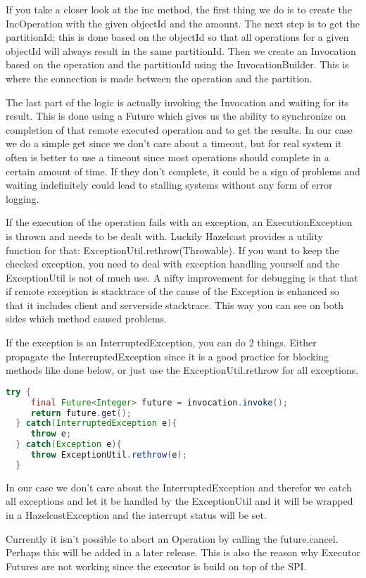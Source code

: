 If you take a closer look at the inc method, the first thing we do is to create the IncOperation with the given objectId and the amount. The next step is to get the partitionId; this is done based on the objectId so that all operations for a given objectId will always result in the same partitionId. Then we create an Invocation based on the operation and the partitionId using the InvocationBuilder. This is where the connection is made between the operation and the partition. 

The last part of the logic is actually invoking the Invocation and waiting for its result. This is done using a Future which gives us the ability to synchronize on completion of that remote executed operation and to get the results. In our case we do a simple get since we don't care about a timeout, but for real system it often is better to use a timeout since most operations should complete in a certain amount of time. If they don't complete, it could be a sign of problems and waiting indefinitely could lead to stalling systems without any form of error logging.

If the execution of the operation fails with an exception, an ExecutionException is thrown and needs to be dealt with. Luckily Hazelcast provides a utility function for that: ExceptionUtil.rethrow(Throwable). If you want to keep the checked exception, you need to deal with exception handling yourself and the ExceptionUtil  is not of much use. 
A nifty improvement for debugging is that that if remote exception is  stacktrace of the cause of the Exception is enhanced so that it includes client and serverside stacktrace. This way you can see on both sides which method caused problems.

If the exception is an InterruptedException, you can do 2 things. Either propagate the InterruptedException since it is a good practice for blocking methods like done below, or just use the ExceptionUtil.rethrow for all exceptions. 
\begin{lstlisting}[language=java]
  try {
     final Future<Integer> future = invocation.invoke();
     return future.get();
  } catch(InterruptedException e){
     throw e;
  } catch(Exception e){
     throw ExceptionUtil.rethrow(e);
  }
\end{lstlisting}
In our case we don't care about the InterruptedException and therefor we catch all exceptions and let it be handled by the ExceptionUtil and it will be wrapped in a HazelcastException and the interrupt status will be set.

Currently it isn't possible to abort an Operation by calling the future.cancel. Perhaps this will be added in a later release. This is also the reason why Executor Futures are not working since the executor is build on top of the SPI.

